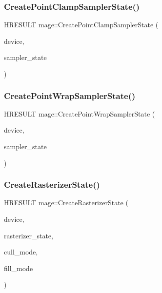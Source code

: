 \hypertarget{namespacemage_a9f3a3ef8e9a08654f98dfaa2e6c77da8}{}\label{namespacemage_a9f3a3ef8e9a08654f98dfaa2e6c77da8} 
\subsubsection{\texorpdfstring{Create\+Point\+Clamp\+Sampler\+State()}{CreatePointClampSamplerState()}}
{\footnotesize\ttfamily H\+R\+E\+S\+U\+LT mage\+::\+Create\+Point\+Clamp\+Sampler\+State (\begin{DoxyParamCaption}\item[{I\+D3\+D11\+Device2 $\ast$}]{device,  }\item[{I\+D3\+D11\+Sampler\+State $\ast$$\ast$}]{sampler\+\_\+state }\end{DoxyParamCaption})}

\hypertarget{namespacemage_a172296a60b063da1f01ad0a4ec828772}{}\label{namespacemage_a172296a60b063da1f01ad0a4ec828772} 
\subsubsection{\texorpdfstring{Create\+Point\+Wrap\+Sampler\+State()}{CreatePointWrapSamplerState()}}
{\footnotesize\ttfamily H\+R\+E\+S\+U\+LT mage\+::\+Create\+Point\+Wrap\+Sampler\+State (\begin{DoxyParamCaption}\item[{I\+D3\+D11\+Device2 $\ast$}]{device,  }\item[{I\+D3\+D11\+Sampler\+State $\ast$$\ast$}]{sampler\+\_\+state }\end{DoxyParamCaption})}

\hypertarget{namespacemage_a801f8c5a484129ae6717733de626b625}{}\label{namespacemage_a801f8c5a484129ae6717733de626b625} 
\subsubsection{\texorpdfstring{Create\+Rasterizer\+State()}{CreateRasterizerState()}}
{\footnotesize\ttfamily H\+R\+E\+S\+U\+LT mage\+::\+Create\+Rasterizer\+State (\begin{DoxyParamCaption}\item[{I\+D3\+D11\+Device2 $\ast$}]{device,  }\item[{I\+D3\+D11\+Rasterizer\+State $\ast$$\ast$}]{rasterizer\+\_\+state,  }\item[{D3\+D11\+\_\+\+C\+U\+L\+L\+\_\+\+M\+O\+DE}]{cull\+\_\+mode,  }\item[{D3\+D11\+\_\+\+F\+I\+L\+L\+\_\+\+M\+O\+DE}]{fill\+\_\+mode }\end{DoxyParamCaption})}

